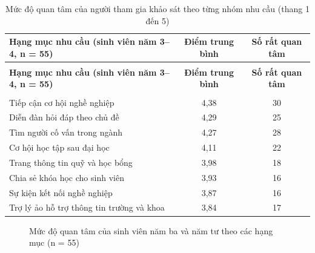 \documentclass[12pt,a4paper,oneside]{report}
\begin{document}
\renewcommand{\arraystretch}{1.25}
{\small
\begin{longtable}{|>{\raggedright\arraybackslash}p{7.4cm}|c|c|}
\caption{Mức độ quan tâm của người tham gia khảo sát theo từng nhóm nhu cầu (thang 1 đến 5)}\label{tab:survey}\\
\hline \textbf{Hạng mục nhu cầu (sinh viên năm 3--4, n = 55)} & \textbf{Điểm trung bình} & \textbf{Số rất quan tâm} \\ \hline
\endfirsthead
\multicolumn{3}{l}{\itshape\small (tiếp theo trang trước)}\\[2pt]
\hline \textbf{Hạng mục nhu cầu (sinh viên năm 3--4, n = 55)} & \textbf{Điểm trung bình} & \textbf{Số rất quan tâm} \\ \hline
\endhead
\hline \multicolumn{3}{r}{\itshape\small (còn tiếp)}\\
\endfoot
\hline
\endlastfoot
Tiếp cận cơ hội nghề nghiệp & 4,38 & 30 \\ \hline
Diễn đàn hỏi đáp theo chủ đề & 4,29 & 25 \\ \hline
Tìm người cố vấn trong ngành & 4,27 & 28 \\ \hline
Cơ hội học tập sau đại học & 4,11 & 22 \\ \hline
Trang thông tin quỹ và học bổng & 3,98 & 18 \\ \hline
Chia sẻ khóa học cho sinh viên & 3,93 & 16 \\ \hline
Sự kiện kết nối nghề nghiệp & 3,87 & 16 \\ \hline
Trợ lý ảo hỗ trợ thông tin trường và khoa & 3,84 & 17 \\ \hline
\end{longtable}
}
\renewcommand{\arraystretch}{1}

\begin{figure}[H]\centering
{}
\caption{Mức độ quan tâm của sinh viên năm ba và năm tư theo các hạng mục (n = 55)}
\label{fig:surveychart}
\end{figure}
\end{document}
